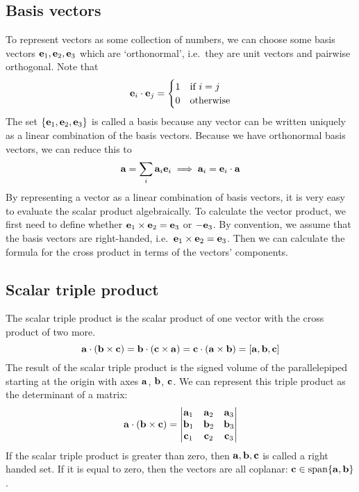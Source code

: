 \subsection{Basis vectors}
To represent vectors as some collection of numbers, we can choose some basis vectors \(\vb e_1, \vb e_2, \vb e_3\) which are `orthonormal', i.e.\ they are unit vectors and pairwise orthogonal.
Note that
\[
	\vb e_i \cdot \vb e_j = \begin{cases}
		1 & \text{if } i = j \\
		0 & \text{otherwise}
	\end{cases}
\]
The set \(\{ \vb e_1, \vb e_2, \vb e_3 \}\) is called a basis because any vector can be written uniquely as a linear combination of the basis vectors.
Because we have orthonormal basis vectors, we can reduce this to
\[
	\vb a = \sum_i \vb a_i \vb e_i \implies \vb a_i = \vb e_i \cdot \vb a
\]
By representing a vector as a linear combination of basis vectors, it is very easy to evaluate the scalar product algebraically.
To calculate the vector product, we first need to define whether \(\vb e_1 \times \vb e_2 = \vb e_3\) or \(-\vb e_3\).
By convention, we assume that the basis vectors are right-handed, i.e.\ \(\vb e_1 \times \vb e_2 = \vb e_3\).
Then we can calculate the formula for the cross product in terms of the vectors' components.

\subsection{Scalar triple product}
The scalar triple product is the scalar product of one vector with the cross product of two more.
\[
	\vb a \cdot (\vb b \times \vb c) = \vb b \cdot (\vb c \times \vb a) = \vb c \cdot (\vb a \times \vb b) = [\vb a, \vb b, \vb c]
\]
The result of the scalar triple product is the signed volume of the parallelepiped starting at the origin with axes \(\vb a\), \(\vb b\), \(\vb c\).
We can represent this triple product as the determinant of a matrix:
\[
	\vb a \cdot (\vb b \times \vb c) =
	\begin{vmatrix}
		\vb a_1 & \vb a_2 & \vb a_3 \\
		\vb b_1 & \vb b_2 & \vb b_3 \\
		\vb c_1 & \vb c_2 & \vb c_3
	\end{vmatrix}
\]
If the scalar triple product is greater than zero, then \(\vb a, \vb b, \vb c\) is called a right handed set.
If it is equal to zero, then the vectors are all coplanar: \(\vb c \in \operatorname{span} \{ \vb a, \vb b \}\).

